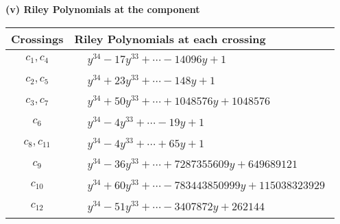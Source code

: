 \documentclass[1p]{elsarticle_modified}
\theoremstyle{definition}
\begin{document}
\newpage\renewcommand{\arraystretch}{1}
\flushleft \textbf{(v) Riley Polynomials at the component}\newline \\
\begin{tabular}{m{50pt}|m{274pt}}
Crossings & \hspace{64pt}Riley Polynomials at each crossing \\
\hline $$\begin{aligned}c_{1},c_{4}\end{aligned}$$&$\begin{aligned}
&y^{34}-17 y^{33}+\cdots-14096 y+1
\end{aligned}$\\
\hline $$\begin{aligned}c_{2},c_{5}\end{aligned}$$&$\begin{aligned}
&y^{34}+23 y^{33}+\cdots-148 y+1
\end{aligned}$\\
\hline $$\begin{aligned}c_{3},c_{7}\end{aligned}$$&$\begin{aligned}
&y^{34}+50 y^{33}+\cdots+1048576 y+1048576
\end{aligned}$\\
\hline $$\begin{aligned}c_{6}\end{aligned}$$&$\begin{aligned}
&y^{34}-4 y^{33}+\cdots-19 y+1
\end{aligned}$\\
\hline $$\begin{aligned}c_{8},c_{11}\end{aligned}$$&$\begin{aligned}
&y^{34}-4 y^{33}+\cdots+65 y+1
\end{aligned}$\\
\hline $$\begin{aligned}c_{9}\end{aligned}$$&$\begin{aligned}
&y^{34}-36 y^{33}+\cdots+7287355609 y+649689121
\end{aligned}$\\
\hline $$\begin{aligned}c_{10}\end{aligned}$$&$\begin{aligned}
&y^{34}+60 y^{33}+\cdots-783443850999 y+115038323929
\end{aligned}$\\
\hline $$\begin{aligned}c_{12}\end{aligned}$$&$\begin{aligned}
&y^{34}-51 y^{33}+\cdots-3407872 y+262144
\end{aligned}$\\
\hline
\end{tabular}\\~\\
\end{document}
